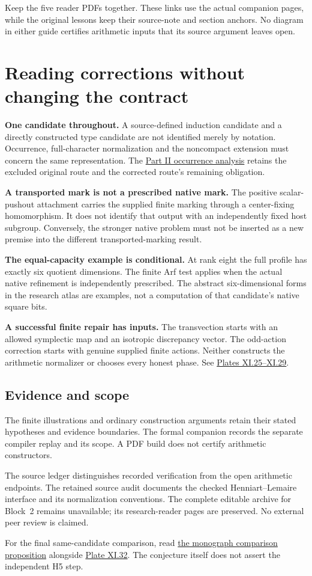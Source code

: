 Keep the five reader PDFs together. These links use the actual companion pages, while the original lessons keep their source-note and section anchors. No diagram in either guide certifies arithmetic inputs that its source argument leaves open.
\clearpage
\section*{Reading corrections without changing the contract}
{}
\textbf{One candidate throughout.} A source-defined induction candidate and a directly constructed type candidate are not identified merely by notation. Occurrence, full-character normalization and the noncompact extension must concern the same representation. The \href{https://komorebi.invalid/b07/visual_occurrence}{Part II occurrence analysis} retains the excluded original route and the corrected route's remaining obligation.

\textbf{A transported mark is not a prescribed native mark.} The positive scalar-pushout attachment carries the supplied finite marking through a center-fixing homomorphism. It does not identify that output with an independently fixed host subgroup. Conversely, the stronger native problem must not be inserted as a new premise into the different transported-marking result.

\textbf{The equal-capacity example is conditional.} At rank eight the full profile has exactly six quotient dimensions. The finite Arf test applies when the actual native refinement is independently prescribed. The abstract six-dimensional forms in the research atlas are examples, not a computation of that candidate's native square bits.

\textbf{A successful finite repair has inputs.} The transvection starts with an allowed symplectic map and an isotropic discrepancy vector. The odd-action correction starts with genuine supplied finite actions. Neither constructs the arithmetic normalizer or chooses every honest phase. See \href{https://komorebi.invalid/b07/visual_repairs}{Plates XI.25--XI.29}.

\subsection*{Evidence and scope}
The finite illustrations and ordinary construction arguments retain their stated hypotheses and evidence boundaries. The formal companion records the separate compiler replay and its scope. A PDF build does not certify arithmetic constructors.

The source ledger distinguishes recorded verification from the open arithmetic endpoints. The retained source audit documents the checked Henniart--Lemaire interface and its normalization conventions. The complete editable archive for Block~2 remains unavailable; its research-reader pages are preserved. No external peer review is claimed.

For the final same-candidate comparison, read \href{https://komorebi.invalid/b07/visual_comparison}{the monograph comparison proposition} alongside \href{https://komorebi.invalid/b07/visual_v32}{Plate XI.32}. The conjecture itself does not assert the independent H5 step.
